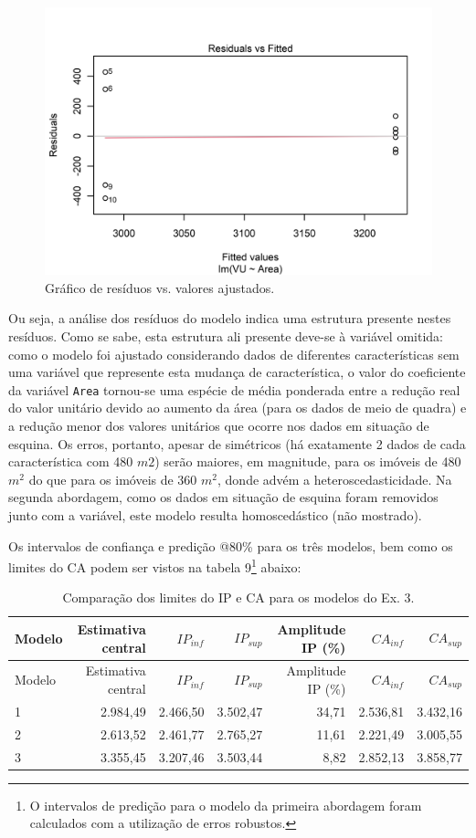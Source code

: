 \documentclass[
  a4paper, 11pt]{article}
\begin{document}
\begin{figure}[H]

{\centering \includegraphics[width=0.65\linewidth]{images/hetero-1} 

}

\caption{Gráfico de resíduos vs. valores ajustados.}\label{fig:hetero}
\end{figure}

Ou seja, a análise dos resíduos do modelo indica uma estrutura presente
nestes resíduos. Como se sabe, esta estrutura ali presente deve-se à
variável omitida: como o modelo foi ajustado considerando dados de
diferentes características sem uma variável que represente esta mudança
de característica, o valor do coeficiente da variável \texttt{Area}
tornou-se uma espécie de média ponderada entre a redução real do valor
unitário devido ao aumento da área (para os dados de meio de quadra) e a
redução menor dos valores unitários que ocorre nos dados em situação de
esquina. Os erros, portanto, apesar de simétricos (há exatamente 2 dados
de cada característica com 480 \(m2\)) serão maiores, em magnitude, para
os imóveis de 480 \(m^2\) do que para os imóveis de 360 \(m^2\), donde
advém a heteroscedasticidade. Na segunda abordagem, como os dados em
situação de esquina foram removidos junto com a variável, este modelo
resulta homoscedástico (não mostrado).

Os intervalos de confiança e predição @80\% para os três modelos, bem
como os limites do CA podem ser vistos na tabela 9\footnote{O intervalos
  de predição para o modelo da primeira abordagem foram calculados com a
  utilização de erros robustos.} abaixo:

\begin{longtable}[]{@{}lrrrrrr@{}}
\caption{Comparação dos limites do IP e CA para os modelos do Ex.
3.}\tabularnewline
\toprule
Modelo & Estimativa central & \(IP_{inf}\) & \(IP_{sup}\) & Amplitude IP
(\%) & \(CA_{inf}\) & \(CA_{sup}\)\tabularnewline
\midrule
\endfirsthead
\toprule
Modelo & Estimativa central & \(IP_{inf}\) & \(IP_{sup}\) & Amplitude IP
(\%) & \(CA_{inf}\) & \(CA_{sup}\)\tabularnewline
\midrule
\endhead
1 & 2.984,49 & 2.466,50 & 3.502,47 & 34,71 & 2.536,81 &
3.432,16\tabularnewline
2 & 2.613,52 & 2.461,77 & 2.765,27 & 11,61 & 2.221,49 &
3.005,55\tabularnewline
3 & 3.355,45 & 3.207,46 & 3.503,44 & 8,82 & 2.852,13 &
3.858,77\tabularnewline
\bottomrule
\end{longtable}
\end{document}
